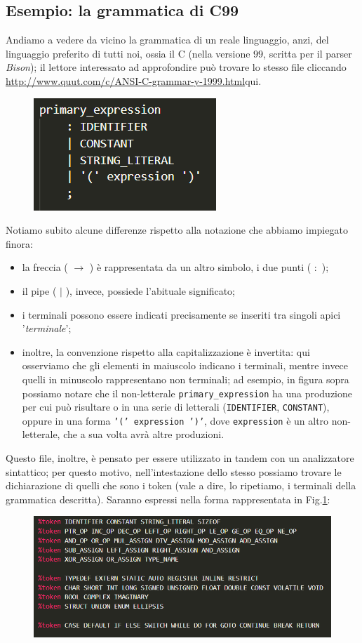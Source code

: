 \documentclass[class=book, crop=false, oneside, 12pt]{standalone}
\begin{document}
\subsection{Esempio: la grammatica di C99}
Andiamo a vedere da vicino la grammatica di un reale linguaggio, anzi, del linguaggio preferito di tutti noi, ossia il C (nella versione \(99\), scritta per il parser \emph{Bison}); il lettore interessato ad approfondire può trovare lo stesso file cliccando \url{http://www.quut.com/c/ANSI-C-grammar-y-1999.html}{qui}.
\begin{figure}[H]
    \centering
    \includegraphics[width=.4\textwidth,keepaspectratio]{c99-ex1}
    \caption{}
\end{figure}
Notiamo subito alcune differenze rispetto alla notazione che abbiamo impiegato finora: 
\begin{itemize}
    \item la freccia ( \(\to\) ) è rappresentata da un altro simbolo, i due punti ( \(:\) );
    \item il pipe ( \(\mid\) ), invece, possiede l'abituale significato;
    \item i terminali possono essere indicati precisamente se inseriti tra singoli apici '\emph{terminale}';
    \item inoltre, la convenzione rispetto alla capitalizzazione è invertita: qui osserviamo che gli elementi in maiuscolo indicano i terminali, mentre invece quelli in minuscolo rappresentano non terminali; ad esempio, in figura sopra possiamo notare che il non-letterale \texttt{primary\_expression} ha una produzione per cui può risultare o in una serie di letterali (\texttt{IDENTIFIER}, \texttt{CONSTANT}), oppure in una forma \texttt{'(' expression ')'}, dove \texttt{expression} è un altro non-letterale, che a sua volta avrà altre produzioni.
\end{itemize}

Questo file, inoltre, è pensato per essere utilizzato in tandem con un analizzatore sintattico; per questo motivo, nell'intestazione dello stesso possiamo trovare le dichiarazione di quelli che sono i token (vale a dire, lo ripetiamo, i terminali della grammatica descritta). Saranno espressi nella forma rappresentata in Fig.\ref{token_c99}:
\begin{figure}[H]
    \centering
    \includegraphics[width=.7\textwidth,keepaspectratio]{c99-ex2}
    \caption{}
    \label{token_c99}
\end{figure}
\end{document}

